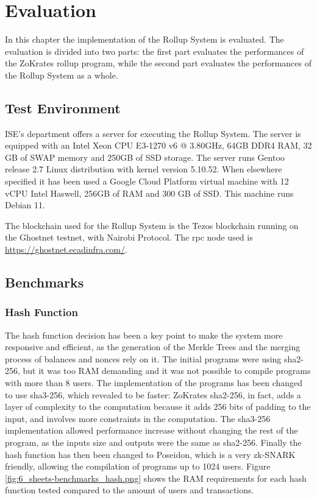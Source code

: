 \chapter{Evaluation\label{cha:chapter6}}

In this chapter the implementation of the Rollup System is evaluated. The evaluation is divided into two parts: the first part evaluates the performances of the ZoKrates rollup program, while the second part evaluates the performances of the Rollup System as a whole.



\section{Test Environment\label{sec:testenvir}}

ISE's department offers a server for executing the Rollup System. The server is equipped with an Intel Xeon CPU E3-1270 v6 @ 3.80GHz, 64GB DDR4 RAM, 32 GB of SWAP memory and 250GB of SSD storage. The server runs Gentoo release 2.7 Linux distribution with kernel version 5.10.52. When elsewhere specified it has been used a Google Cloud Platform virtual machine with 12 vCPU Intel Haswell, 256GB of RAM and 300 GB of SSD. This machine runs Debian 11.

The blockchain used for the Rollup System is the Tezos blockchain running on the Ghostnet testnet, with Nairobi Protocol. The rpc node used is \url{https://ghostnet.ecadinfra.com/}.


\section{Benchmarks\label{sec:benchmarks}}

\subsection{Hash Function\label{subsec:6_hashfunc}}

The hash function decision has been a key point to make the system more responsive and efficient, as the generation of the Merkle Trees and the merging process of balances and nonces rely on it. The initial programs were using sha2-256, but it was too RAM demanding and it was not possible to compile programs with more than 8 users. The implementation of the programs has been changed to use sha3-256, which revealed to be faster: ZoKrates sha2-256, in fact, adds a layer of complexity to the computation because it adds 256 bits of padding to the input, and involves more constraints in the computation. The sha3-256 implementation allowed performance increase without changing the rest of the program, as the inputs size and outputs were the same as sha2-256.
Finally the hash function has then been changed to Poseidon, which is a very zk-SNARK friendly, allowing the compilation of programs up to 1024 users. Figure \ref{fig:6_sheets-benchmarks_hash.png} shows the RAM requirements for each hash function tested compared to the amount of users and transactions.

